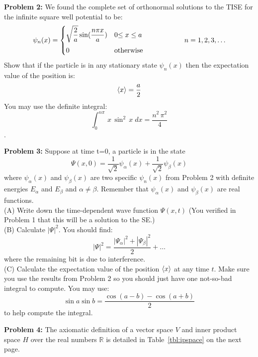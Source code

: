 \documentclass[12pt]{article}
\begin{document}
\noindent
{\bf Problem 2:} We found the complete set of orthonormal solutions to the TISE for the infinite square well potential to be:
\begin{equation}
\label{eqn:psin-isw}
\psi_n(x) = 
\begin{cases}    
   {\displaystyle \sqrt{\frac{2}{a}}\sin(\frac{n \pi x}{a})} & 0 {\displaystyle \leq x \leq a} \\[8pt]
   0 & {\rm otherwise} \\
\end{cases}   
\hspace{2cm} n=1,2,3,\ldots
\end{equation}
Show that if the particle is in any stationary state $\psi_n(x)$ then the expectation value of the position is:
$$\braket{x} = \frac{a}{2}$$
You may use the definite integral:
$$\int_0^{n\pi} \, x \, \sin^2 \, x \;dx = \frac{n^2 \, \pi^2}{4}$$.

\newpage

\noindent
{\bf Problem 3:} Suppose at time t=0, a particle is in the state
$$\Psi(x,0) = \frac{1}{\sqrt{2}} \psi_\alpha(x) + \frac{1}{\sqrt{2}} \psi_\beta(x)$$
where $\psi_\alpha(x)$ and $\psi_\beta(x)$ are two specific $\psi_n(x)$ from Problem 2 with definite energies $E_\alpha$ and $E_\beta$ and $\alpha \neq \beta$. Remember that $\psi_\alpha(x)$ and $\psi_\beta(x)$ are real functions.\\[5pt]

\noindent
(A) Write down the time-dependent wave function $\Psi(x,t)$  (You verified in Problem 1 that this will be a solution to the SE.)\\[5pt]

\noindent
(B) Calculate $|\Psi|^2$. You should find:
$$ |\Psi|^2 = \frac{|\Psi_\alpha|^2 + |\Psi_\beta|^2}{2} + \ldots $$
where the remaining bit is due to interference.\\[5pt]

\noindent
(C) Calculate the expectation value of the position $\braket{x}$ at any time $t$.  Make sure you use the results from Problem 2 so you should just have one not-so-bad integral to compute.  You may use:
$$\sin a \sin b = \frac{\cos(a-b) - \cos(a+b)}{2}$$
to help compute the integral.

\vskip 1cm
\noindent
{\bf Problem 4:} The axiomatic definition of a vector space $V$ and inner product space $H$ over the real numbers $\mathbb{R}$ is detailed in Table~\ref{tbl:ipspace} on the next page.\\[5pt]
    
\end{document}
